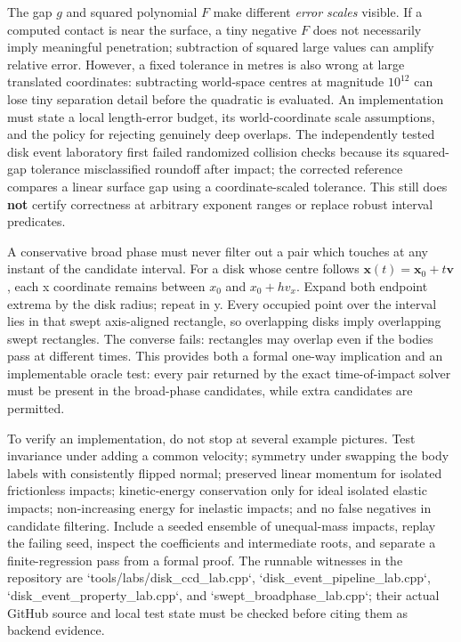 The gap \(g\) and squared polynomial \(F\) make different \emph{error scales} visible. If a computed contact is near the surface, a tiny negative \(F\) does not necessarily imply meaningful penetration; subtraction of squared large values can amplify relative error. However, a fixed tolerance in metres is also wrong at large translated coordinates: subtracting world-space centres at magnitude \(10^{12}\) can lose tiny separation detail before the quadratic is evaluated. An implementation must state a local length-error budget, its world-coordinate scale assumptions, and the policy for rejecting genuinely deep overlaps. The independently tested disk event laboratory first failed randomized collision checks because its squared-gap tolerance misclassified roundoff after impact; the corrected reference compares a linear surface gap using a coordinate-scaled tolerance. This still does \textbf{not} certify correctness at arbitrary exponent ranges or replace robust interval predicates.

A conservative broad phase must never filter out a pair which touches at any instant of the candidate interval. For a disk whose centre follows \(\mathbf x(t)=\mathbf x_0+t\mathbf v\), each x coordinate remains between \(x_0\) and \(x_0+hv_x\). Expand both endpoint extrema by the disk radius; repeat in y. Every occupied point over the interval lies in that swept axis-aligned rectangle, so overlapping disks imply overlapping swept rectangles. The converse fails: rectangles may overlap even if the bodies pass at different times. This provides both a formal one-way implication and an implementable oracle test: every pair returned by the exact time-of-impact solver must be present in the broad-phase candidates, while extra candidates are permitted.

To verify an implementation, do not stop at several example pictures. Test invariance under adding a common velocity; symmetry under swapping the body labels with consistently flipped normal; preserved linear momentum for isolated frictionless impacts; kinetic-energy conservation only for ideal isolated elastic impacts; non-increasing energy for inelastic impacts; and no false negatives in candidate filtering. Include a seeded ensemble of unequal-mass impacts, replay the failing seed, inspect the coefficients and intermediate roots, and separate a finite-regression pass from a formal proof. The runnable witnesses in the repository are `tools/labs/disk\_ccd\_lab.cpp`, `disk\_event\_pipeline\_lab.cpp`, `disk\_event\_property\_lab.cpp`, and `swept\_broadphase\_lab.cpp`; their actual GitHub source and local test state must be checked before citing them as backend evidence.

